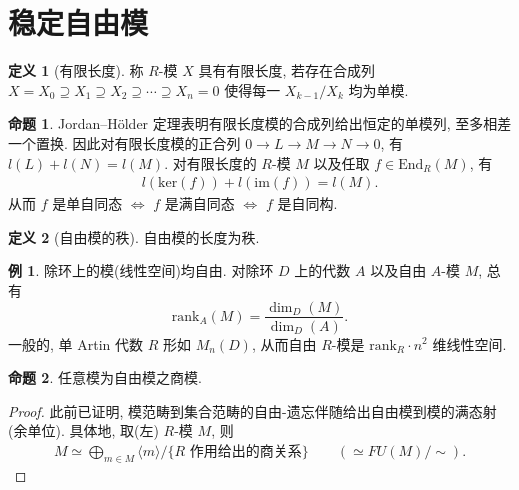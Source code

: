 \documentclass{MainStyle}
\theoremstyle{definition}
\newtheorem{example}{例}
\theoremstyle{definition}
\theoremstyle{definition}
\newtheorem{definition}{定义}
\theoremstyle{definition}
\newtheorem{proposition}{命题}
\theoremstyle{definition}
\theoremstyle{definition}
\theoremstyle{definition}
\theoremstyle{remark}
\theoremstyle{remark}
\begin{document}
\maketitle
\section{稳定自由模}
\begin{definition}[有限长度]
    称 $R$-模 $X$ 具有有限长度, 若存在合成列 $X=X_0\supseteq X_1\supseteq X_2\supseteq \cdots \supseteq X_n=0$ 使得每一 $X_{k-1}/X_k$ 均为单模.
\end{definition}

\begin{proposition}
    Jordan–Hölder 定理表明有限长度模的合成列给出恒定的单模列, 至多相差一个置换. 因此对有限长度模的正合列 $0\to L\to M\to N\to 0$, 有 $l(L)+l(N)=l(M)$. 对有限长度的 $R$-模 $M$ 以及任取 $f\in \mathrm{End}_R(M)$, 有
    \begin{align*}
        l(\mathrm{ker}(f))+l(\mathrm{im}(f))=l(M).
    \end{align*}
    从而 $f$ 是单自同态 $\Longleftrightarrow$ $f$ 是满自同态 $\Longleftrightarrow$ $f$ 是自同构.
\end{proposition}

\begin{definition}[自由模的秩]
    自由模的长度为秩.
\end{definition}

\begin{example}
    除环上的模(线性空间)均自由. 对除环 $D$ 上的代数 $A$ 以及自由 $A$-模 $M$, 总有
    \begin{equation*}
        \mathrm{rank}_A(M)=\dfrac{\dim_D(M)}{\dim_D(A)}.
    \end{equation*}
    一般的, 单 Artin 代数 $R$ 形如 $M_n(D)$, 从而自由 $R$-模是 $\mathrm{rank}_R\cdot n^2$ 维线性空间.
\end{example}

\begin{proposition}
    任意模为自由模之商模.
    \begin{proof}
        此前已证明, 模范畴到集合范畴的自由-遗忘伴随给出自由模到模的满态射(余单位). 具体地, 取(左) $R$-模 $M$, 则
        \begin{align*}
            M\simeq \bigoplus_{m\in M} \langle m\rangle \Big/\{R\text{ 作用给出的商关系}\}\qquad (\simeq FU(M)/\sim ).
        \end{align*}
    \end{proof}
\end{proposition}
\end{document}
